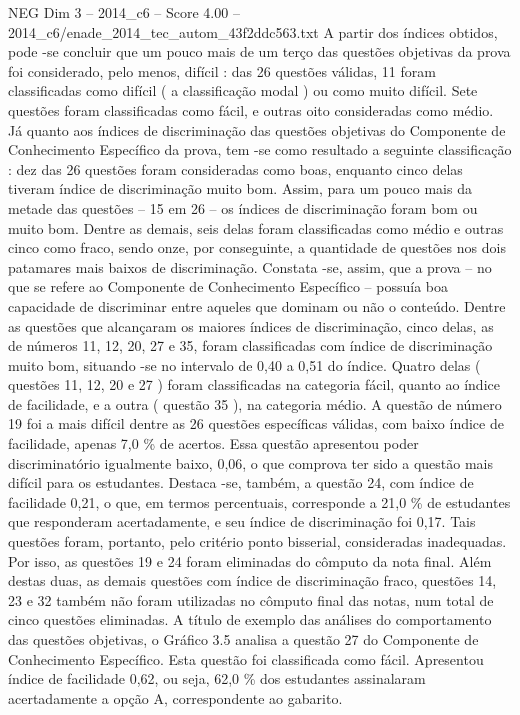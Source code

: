 \begin{textsample}{NEG Dim 3 – 2014\_c6 – Score 4.00 – 2014\_c6/enade\_2014\_tec\_autom\_43f2ddc563.txt}
A partir dos índices obtidos, pode -se concluir que um pouco mais de um terço das questões objetivas da prova foi considerado, pelo menos, difícil : das 26 questões válidas, 11 foram classificadas como difícil ( a classificação modal ) ou como muito difícil.
Sete questões foram classificadas como fácil, e outras oito consideradas como médio.
Já quanto aos índices de discriminação das questões objetivas do Componente de Conhecimento Específico da prova, tem -se como resultado a seguinte classificação : dez das 26 questões foram consideradas como boas, enquanto cinco delas tiveram índice de discriminação muito bom.
Assim, para um pouco mais da metade das questões – 15 em 26 – os índices de discriminação foram bom ou muito bom.
Dentre as demais, seis delas foram classificadas como médio e outras cinco como fraco, sendo onze, por conseguinte, a quantidade de questões nos dois patamares mais baixos de discriminação.
Constata -se, assim, que a prova – no que se refere ao Componente de Conhecimento Específico – possuía boa capacidade de discriminar entre aqueles que dominam ou não o conteúdo.
Dentre as questões que alcançaram os maiores índices de discriminação, cinco delas, as de números 11, 12, 20, 27 e 35, foram classificadas com índice de discriminação muito bom, situando -se no intervalo de 0,40 a 0,51 do índice.
Quatro delas ( questões 11, 12, 20 e 27 ) foram classificadas na categoria fácil, quanto ao índice de facilidade, e a outra ( questão 35 ), na categoria médio.
A questão de número 19 foi a mais difícil dentre as 26 questões específicas válidas, com baixo índice de facilidade, apenas 7,0 \% de acertos.
Essa questão apresentou poder discriminatório igualmente baixo, 0,06, o que comprova ter sido a questão mais difícil para os estudantes.
Destaca -se, também, a questão 24, com índice de facilidade 0,21, o que, em termos percentuais, corresponde a 21,0 \% de estudantes que responderam acertadamente, e seu índice de discriminação foi 0,17.
Tais questões foram, portanto, pelo critério ponto bisserial, consideradas inadequadas.
Por isso, as questões 19 e 24 foram eliminadas do cômputo da nota final.
Além destas duas, as demais questões com índice de discriminação fraco, questões 14, 23 e 32 também não foram utilizadas no cômputo final das notas, num total de cinco questões eliminadas.
A título de exemplo das análises do comportamento das questões objetivas, o Gráfico 3.5 analisa a questão 27 do Componente de Conhecimento Específico.
Esta questão foi classificada como fácil.
Apresentou índice de facilidade 0,62, ou seja, 62,0 \% dos estudantes assinalaram acertadamente a opção A, correspondente ao gabarito.

\end{textsample}
